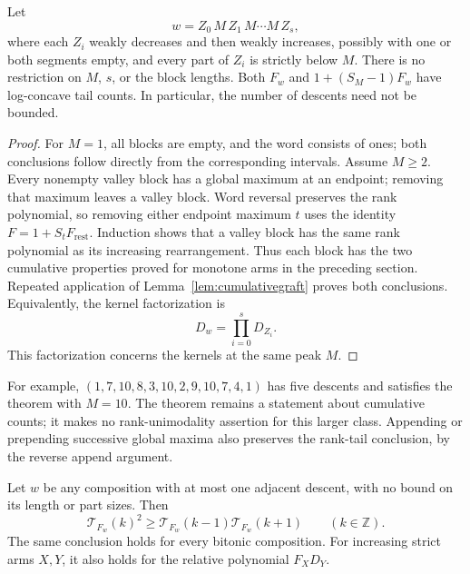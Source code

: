 \begin{theorem}
\label{thm:separated}
Let
\[
 w=Z_0\,M\,Z_1\,M\cdots M\,Z_s,
\]
where each $Z_i$ weakly decreases and then weakly increases, possibly
with one or both segments empty, and every part of $Z_i$ is strictly
below $M$.
There is no restriction on $M$, $s$, or the block lengths.
Both $F_w$ and $1+(S_M-1)F_w$ have log-concave tail counts.
In particular, the number of descents need not be bounded.
\end{theorem}
\begin{proof}
For $M=1$, all blocks are empty, and the word consists of ones;
both conclusions follow directly from the corresponding intervals.
Assume $M\ge2$. Every nonempty valley block has a global maximum at
an endpoint; removing that maximum leaves a valley block. Word reversal
preserves the rank polynomial, so removing either endpoint maximum $t$
uses the identity $F=1+S_tF_{\mathrm{rest}}$. Induction shows that a
valley block has the same rank polynomial as its increasing rearrangement.
Thus each block has the two cumulative properties proved for monotone
arms in the preceding section. Repeated application of
Lemma~\ref{lem:cumulativegraft} proves both conclusions. Equivalently,
the kernel factorization is
\[
 D_w=\prod_{i=0}^s D_{Z_i}.
\]
This factorization concerns the kernels at the same peak $M$.
\end{proof}

For example, $(1,7,10,8,3,10,2,9,10,7,4,1)$ has five descents and
satisfies the theorem with $M=10$. The theorem remains a statement about
cumulative counts; it makes no rank-unimodality assertion for this
larger class. Appending or prepending successive global maxima also
preserves the rank-tail conclusion, by the reverse append argument.

\begin{theorem}
Let $w$ be any composition with at most one adjacent descent, with no
bound on its length or part sizes. Then
\[
 \mathcal T_{F_w}(k)^2\ge
 \mathcal T_{F_w}(k-1)\mathcal T_{F_w}(k+1)
 \qquad(k\in\mathbb Z).
\]
The same conclusion holds for every bitonic composition. For increasing
strict arms $X,Y$, it also holds for the relative polynomial $F_XD_Y$.
\end{theorem}

